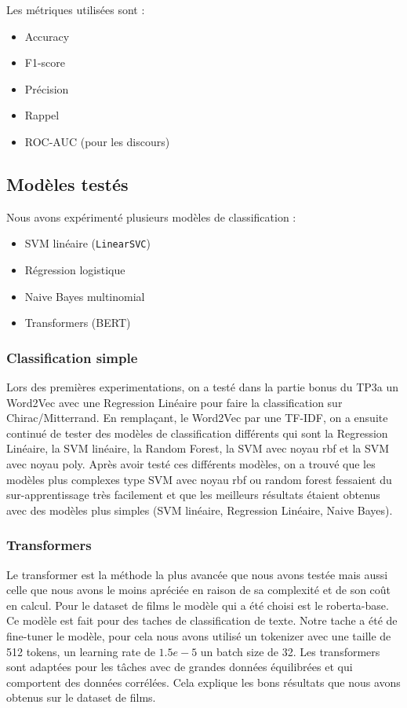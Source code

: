 \documentclass{article}
\begin{document}
Les métriques utilisées sont :
\begin{itemize}
\item Accuracy
\item F1-score
\item Précision
\item Rappel
\item ROC-AUC (pour les discours)
\end{itemize}

\subsection{Modèles testés}

Nous avons expérimenté plusieurs modèles de classification :

\begin{itemize}
\item SVM linéaire (\texttt{LinearSVC})
\item Régression logistique
\item Naive Bayes multinomial
\item Transformers (BERT)
\end{itemize}

\subsubsection{Classification simple}
Lors des premières experimentations, on a testé dans la partie bonus du TP3a un Word2Vec avec une Regression Linéaire pour faire la classification sur Chirac/Mitterrand.
En remplaçant, le Word2Vec par une TF-IDF, on a ensuite continué de tester des modèles de classification différents qui sont la Regression Linéaire, la SVM linéaire, la Random Forest, la SVM avec noyau rbf et la SVM avec noyau poly. Après avoir testé ces différents modèles, on a trouvé que les modèles plus complexes type SVM avec noyau rbf ou random forest fessaient du sur-apprentissage très facilement et que les meilleurs résultats étaient obtenus avec des modèles plus simples (SVM linéaire, Regression Linéaire, Naive Bayes).

\subsubsection{Transformers}

Le transformer est la méthode la plus avancée que nous avons testée mais aussi celle que nous avons le moins apréciée en raison de sa complexité et de son coût en calcul. Pour le dataset de films le modèle qui a été choisi est le roberta-base. Ce modèle est fait pour des taches de classification de texte. Notre tache a été de fine-tuner le modèle, pour cela nous avons utilisé un tokenizer avec une taille de 512 tokens, un learning rate de $1.5e-5$ un batch size de 32. Les transformers sont adaptées pour les tâches avec de grandes données équilibrées et qui comportent des données corrélées. Cela explique les bons résultats que nous avons obtenus sur le dataset de films.\\
\end{document}
